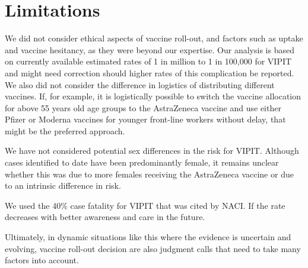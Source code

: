 \documentclass[]{interact}
\theoremstyle{plain}%
\theoremstyle{definition}
\theoremstyle{remark}
\begin{document}
\hypertarget{limitations}{%
\section{Limitations}\label{limitations}}

We did not consider ethical aspects of vaccine roll-out, and factors
such as uptake and vaccine hesitancy, as they were beyond our expertise.
Our analysis is based on currently available estimated rates of 1 in
million to 1 in 100,000 for VIPIT and might need correction should
higher rates of this complication be reported. We also did not consider
the difference in logistics of distributing different vaccines. If, for
example, it is logistically possible to switch the vaccine allocation
for above 55 years old age groups to the AstraZeneca vaccine and use
either Pfizer or Moderna vaccines for younger front-line workers without
delay, that might be the preferred approach.

We have not considered potential sex differences in the risk for VIPIT.
Although cases identified to date have been predominantly female, it
remains unclear whether this was due to more females receiving the
AstraZeneca vaccine or due to an intrinsic difference in risk.

We used the 40\% case fatality for VIPIT that was cited by NACI. If the
rate decreases with better awareness and care in the future.

Ultimately, in dynamic situations like this where the evidence is
uncertain and evolving, vaccine roll-out decision are also judgment
calls that need to take many factors into account.



\end{document}
